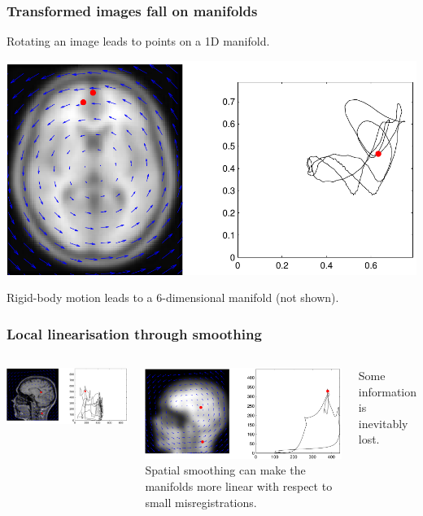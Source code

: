 \begin{frame}
\frametitle{Transformed images fall on manifolds}
Rotating an image leads to points on a 1D manifold.\par
\includegraphics[width=\textwidth]{manifold_rotation}

Rigid-body motion leads to a 6-dimensional manifold (not shown).

\end{frame}

\begin{frame}
\frametitle{Local linearisation through smoothing}
\begin{columns}[c]
\includegraphics[width=\textwidth]{manifold_unsmoothed}\par
\includegraphics[width=\textwidth]{manifold_smoothed}
Spatial smoothing can make the manifolds more linear with respect to small misregistrations.

Some information is inevitably lost.
\end{columns}
\end{frame}

